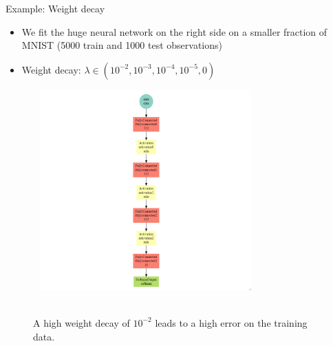 \begin{vbframe}{Example: Weight decay}
\begin{minipage}{0.45\textwidth}
\begin{itemize}
\item We fit the huge neural network on the right side on a smaller fraction of MNIST (5000 train and 1000 test observations)
\item Weight decay: $\lambda \in (10^{-2}, 10^{-3}, 10^{-4}, 10^{-5}, 0)$
\end{itemize}
\end{minipage}
\begin{minipage}{0.45\textwidth}
\begin{figure}
\centering
\includegraphics[width= 8.7cm, height=7.7cm]{figure/mxnet_graph_decay.png}
\end{figure}
\end{minipage}
\framebreak

\begin{figure}
\centering
{}
\\
A high weight decay of $10^{-2}$ leads to a high error on the training data.
\end{figure}


\end{vbframe}
